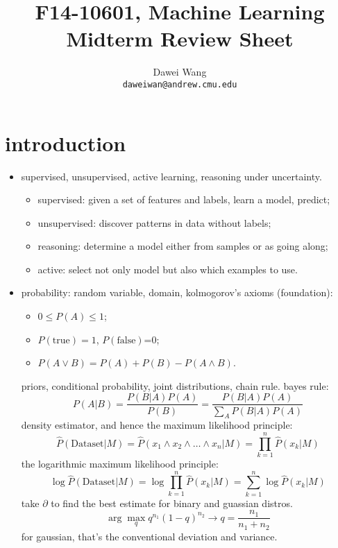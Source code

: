\documentclass{article}
\begin{document}
\title{F14-10601, Machine Learning \\ Midterm Review Sheet}
\author{Dawei Wang \\ \tt daweiwan@andrew.cmu.edu}

\maketitle

\section{introduction}
\begin{itemize}
	\item supervised, unsupervised, active learning, reasoning under uncertainty.
		\begin{itemize}
			\item supervised: given a set of features and labels, learn a model, predict;
			\item unsupervised: discover patterns in data without labels; 
			\item reasoning: determine a model either from samples or as going along; 
			\item active: select not only model but also which examples to use. 
		\end{itemize}
	\item probability: random variable, domain, kolmogorov's axioms (foundation):
		\begin{itemize}
			\item $0\le P(A)\le1$;
			\item $P(\text{true})=1$, $P(\text{false})$=0;
			\item $P(A\vee B)=P(A)+P(B)-P(A\wedge B)$.
		\end{itemize}
		 priors,
		conditional probability, joint distributions, chain rule. bayes rule:
		\begin{equation}
			P(A|B)=\frac{P(B|A)P(A)}{P(B)}=\frac{P(B|A)P(A)}{\sum_AP(B|A)P(A)}
		\end{equation}
		density estimator, and hence the maximum likelihood principle:
		\begin{equation}
			\hat P(\text{Dataset}|M)=\hat P(x_1\wedge x_2\wedge\dots\wedge x_n|M)
			=\prod_{k=1}^n\hat P(x_k|M)
		\end{equation}
		the logarithmic maximum likelihood principle:
		\begin{equation}
			\log\hat P(\text{Dataset}|M)=\log\prod_{k=1}^n\hat P(x_k|M)
				=\sum_{k=1}^n\log\hat P(x_k|M)
		\end{equation}
		take $\partial$ to find the best estimate for binary and guassian distros.
		\begin{equation}
			\arg\max_qq^{n_1}(1-q)^{n_2}\rightarrow q=\frac{n_1}{n_1+n_2}
		\end{equation}
		for gaussian, that's the conventional deviation and variance. 
\end{itemize}
\end{document}
